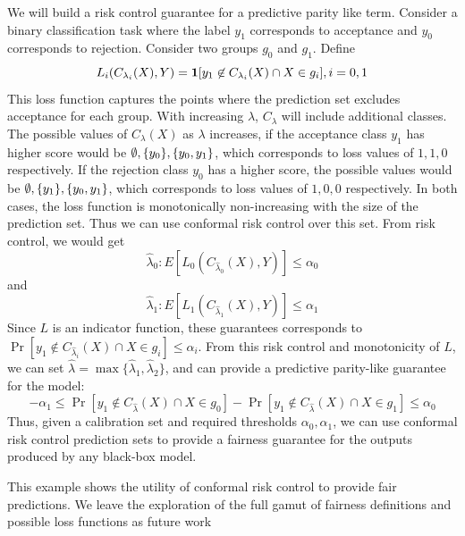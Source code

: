 We will build a risk control guarantee for a predictive parity like term.
Consider a binary classification task where the label $y_1$ corresponds to acceptance and $y_0$ corresponds to rejection.
Consider two groups $g_0$ and $g_1$.
Define 
\[
    L_i(C_{\lambda_i}(X), Y) = \bm{1}[y_1 \not\in C_{\lambda_i}(X) \cap X \in g_i], i = 0, 1
\]
This loss function captures the points where the prediction set excludes acceptance for each group.
With increasing $\lambda$, $C_\lambda$ will include additional classes.
The possible values of $C_\lambda(X)$ as $\lambda$ increases, if the acceptance class $y_1$ has higher score would be $\emptyset, \{y_0\}, \{y_0, y_1\}$, which corresponds to loss values of $1, 1, 0$ respectively.
If the rejection class $y_0$ has a higher score, the possible values would be $\emptyset, \{y_1\}, \{y_0, y_1\}$, which corresponds to loss values of $1, 0, 0$ respectively.
In both cases, the loss function is monotonically non-increasing with the size of the prediction set.
Thus we can use conformal risk control over this set.
From risk control, we would get 
\[
    \hat{\lambda}_0 : E[L_0(C_{\hat{\lambda}_0}(X), Y)] \leq \alpha_0
\]
and 
\[
    \hat{\lambda}_1 : E[L_1(C_{\hat{\lambda}_1}(X), Y)] \leq \alpha_1
\]
Since $L$ is an indicator function, these guarantees corresponds to $\Pr[y_1 \not\in C_{\hat{\lambda}_i}(X) \cap X \in g_i] \leq \alpha_i$.
From this risk control and monotonicity of $L$, we can set $\hat{\lambda} = \max\{\hat{\lambda}_1, \hat{\lambda}_2\}$, and can provide a predictive parity-like guarantee for the model:
\[
    -\alpha_1 \leq \Pr[y_1 \not\in C_{\hat{\lambda}}(X) \cap X \in g_0] - \Pr[y_1 \not\in C_{\hat{\lambda}}(X) \cap X \in g_1] \leq \alpha_0
\]
Thus, given a calibration set and required thresholds $\alpha_0, \alpha_1$, we can use conformal risk control prediction sets to provide a fairness guarantee for the outputs produced by any black-box model.

This example shows the utility of conformal risk control to provide fair predictions.
We leave the exploration of the full gamut of fairness definitions and possible loss functions as future work

